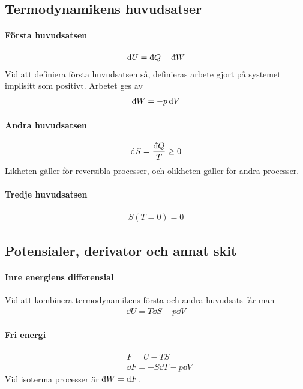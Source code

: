 \subsection{Termodynamikens huvudsatser}

\paragraph{Första huvudsatsen}
\begin{align*}
	\dd{U} = \idd Q - \idd W
\end{align*}
Vid att definiera första huvudsatsen så, definieras arbete gjort på systemet implisitt som positivt. Arbetet ges av
\begin{align*}
	\idd W = -p\dd{V}
\end{align*}

\paragraph{Andra huvudsatsen}
\begin{align*}
	\dd{S} = \frac{\idd Q}{T} \geq 0
\end{align*}
Likheten gäller för reversibla processer, och olikheten gäller för andra processer.

\paragraph{Tredje huvudsatsen}
\begin{align*}
	S(T = 0) = 0
\end{align*}

\subsection{Potensialer, derivator och annat skit}

\paragraph{Inre energiens differensial}
Vid att kombinera termodynamikens första och andra huvudsats får man
\begin{align*}
	\dd{U} = T\dd{S} - p\dd{V}
\end{align*}

\paragraph{Fri energi}
\begin{align*}
	& F = U -TS\\
	& \dd{F} = -S\dd{T} - p\dd{V}
\end{align*}
Vid isoterma processer är $\idd W = \dd{F}$.

